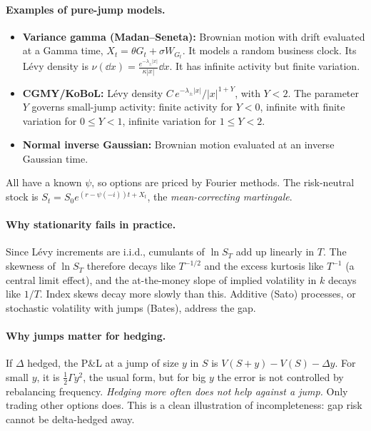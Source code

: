 \paragraph{Examples of pure-jump models.}
\begin{itemize}
\item \textbf{Variance gamma (Madan--Seneta):} Brownian motion with drift evaluated at a Gamma time, $X_t=\theta G_t+\sigma W_{G_t}$. It models a random business clock. Its L\'evy density is $\nu(\dd x)=\frac{e^{-\lambda_\pm|x|}}{\kappa|x|}\dd x$. It has infinite activity but finite variation.
\item \textbf{CGMY/KoBoL:} L\'evy density $C\,e^{-\lambda_\pm|x|}/|x|^{1+Y}$, with $Y<2$. The parameter $Y$ governs small-jump activity: finite activity for $Y<0$, infinite with finite variation for $0\le Y<1$, infinite variation for $1\le Y<2$.
\item \textbf{Normal inverse Gaussian:} Brownian motion evaluated at an inverse Gaussian time.
\end{itemize}
All have a known $\psi$, so options are priced by Fourier methods. The risk-neutral stock is $S_t=S_0e^{(r-\psi(-i))t+X_t}$, the \emph{mean-correcting martingale}.

\paragraph{Why stationarity fails in practice.} Since L\'evy increments are i.i.d., cumulants of $\ln S_T$ add up linearly in $T$. The skewness of $\ln S_T$ therefore decays like $T^{-1/2}$ and the excess kurtosis like $T^{-1}$ (a central limit effect), and the at-the-money slope of implied volatility in $k$ decays like $1/T$. Index skews decay more slowly than this. Additive (Sato) processes, or stochastic volatility with jumps (Bates), address the gap.

\paragraph{Why jumps matter for hedging.} If $\Delta$ hedged, the P\&L at a jump of size $y$ in $S$ is $V(S+y)-V(S)-\Delta y$. For small $y$, it is $\tfrac12\Gamma y^2$, the usual form, but for big $y$ the error is not controlled by rebalancing frequency. \emph{Hedging more often does not help against a jump.} Only trading other options does. This is a clean illustration of incompleteness: gap risk cannot be delta-hedged away.

